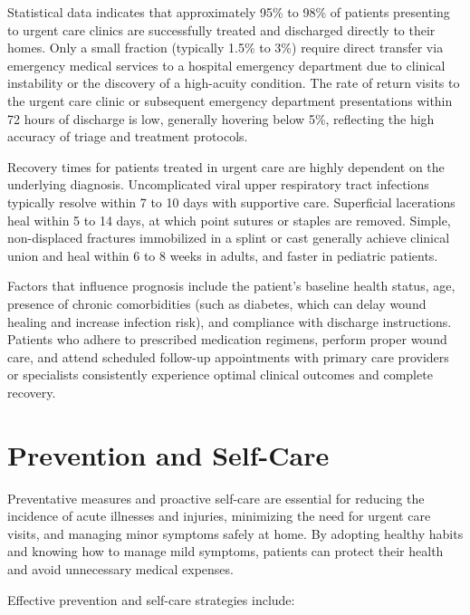 Statistical data indicates that approximately 95\% to 98\% of patients presenting to urgent care clinics are successfully treated and discharged directly to their homes. Only a small fraction (typically 1.5\% to 3\%) require direct transfer via emergency medical services to a hospital emergency department due to clinical instability or the discovery of a high-acuity condition. The rate of return visits to the urgent care clinic or subsequent emergency department presentations within 72 hours of discharge is low, generally hovering below 5\%, reflecting the high accuracy of triage and treatment protocols.

Recovery times for patients treated in urgent care are highly dependent on the underlying diagnosis. Uncomplicated viral upper respiratory tract infections typically resolve within 7 to 10 days with supportive care. Superficial lacerations heal within 5 to 14 days, at which point sutures or staples are removed. Simple, non-displaced fractures immobilized in a splint or cast generally achieve clinical union and heal within 6 to 8 weeks in adults, and faster in pediatric patients.

Factors that influence prognosis include the patient's baseline health status, age, presence of chronic comorbidities (such as diabetes, which can delay wound healing and increase infection risk), and compliance with discharge instructions. Patients who adhere to prescribed medication regimens, perform proper wound care, and attend scheduled follow-up appointments with primary care providers or specialists consistently experience optimal clinical outcomes and complete recovery.

\section*{Prevention and Self-Care}
Preventative measures and proactive self-care are essential for reducing the incidence of acute illnesses and injuries, minimizing the need for urgent care visits, and managing minor symptoms safely at home. By adopting healthy habits and knowing how to manage mild symptoms, patients can protect their health and avoid unnecessary medical expenses.

Effective prevention and self-care strategies include:

